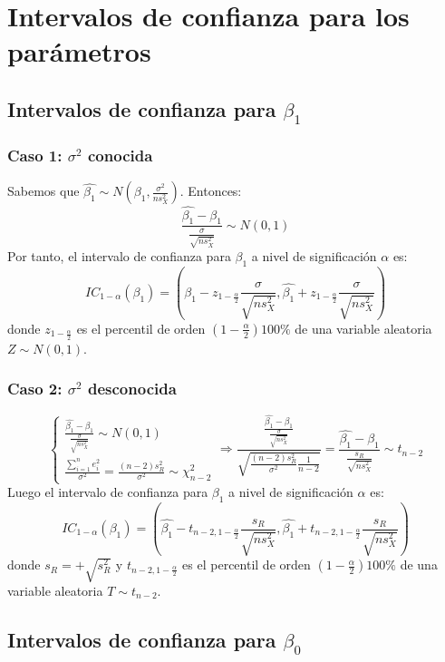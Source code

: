 \documentclass{report}
\theoremstyle{remark}
\theoremstyle{remark}
\theoremstyle{remark}
\theoremstyle{definition}
\theoremstyle{definition}
\theoremstyle{definition}
\begin{document}
\section{Intervalos de confianza para los parámetros}
\subsection*{Intervalos de confianza para $\beta_1$}
\subsubsection*{Caso 1: $\sigma^2$ conocida}
Sabemos que $\hat{\beta_1} \sim N(\beta_1, \frac{\sigma^2}{ns_X^2})$. Entonces:
$$\frac{\hat{\beta_1} - \beta_1}{\frac{\sigma}{\sqrt{ns_X^2}}} \sim N(0, 1)$$
Por tanto, el intervalo de confianza para $\beta_1$ a nivel de significación $\alpha$ es:
$$IC_{1-\alpha}(\beta_1) = \left( \hat{\beta_1} - z_{1-\frac{\alpha}{2}} \frac{\sigma}{\sqrt{ns_X^2}}, \hat{\beta_1} + z_{1-\frac{\alpha}{2}} \frac{\sigma}{\sqrt{ns_X^2}} \right)$$
donde $z_{1-\frac{\alpha}{2}}$ es el percentil de orden $(1 - \frac{\alpha}{2}) 100\%$ de una variable aleatoria $Z \sim N(0, 1)$.

\subsubsection*{Caso 2: $\sigma^2$ desconocida}
$$\begin{cases}
        \frac{\hat{\beta_1} - \beta_1}{\frac{\sigma}{\sqrt{ns_X^2}}} \sim N(0, 1) \\
        \frac{\sum_{i=1}^n e_i^2}{\sigma^2} = \frac{(n-2)s_R^2}{\sigma^2} \sim \chi^2_{n-2}
    \end{cases} \Rightarrow
    \frac{\frac{\hat{\beta_1} - \beta_1}{\frac{\sigma}{\sqrt{ns_X^2}}}}{\sqrt{\frac{(n-2)s_R^2}{\sigma^2} \frac{1}{n-2}}} = \frac{\hat{\beta_1} - \beta_1}{\frac{s_R}{\sqrt{ns_X^2}}} \sim t_{n-2}$$
Luego el intervalo de confianza para $\beta_1$ a nivel de significación $\alpha$ es:
$$IC_{1-\alpha}(\beta_1) = \left( \hat{\beta_1} - t_{n-2, 1-\frac{\alpha}{2}} \frac{s_R}{\sqrt{ns_X^2}}, \hat{\beta_1} + t_{n-2, 1-\frac{\alpha}{2}} \frac{s_R}{\sqrt{ns_X^2}} \right)$$
donde $s_R = +\sqrt{s_R^2}$ y $t_{n-2, 1-\frac{\alpha}{2}}$ es el percentil de orden $(1 - \frac{\alpha}{2}) 100\%$ de una variable aleatoria $T \sim t_{n-2}$.

\subsection*{Intervalos de confianza para $\beta_0$}
\end{document}
